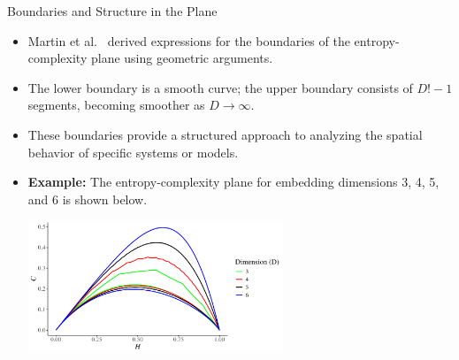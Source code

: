 \documentclass{beamer}
\begin{document}
	
	 


\begin{frame}{Boundaries and Structure in the Plane}
	\begin{itemize}
		\item Martin et al.~\cite{Martin2006} derived expressions for the boundaries of the entropy-complexity plane using geometric arguments.
		\item The \alert{lower boundary} is a smooth curve; the \alert{upper boundary} consists of $D!-1$ segments, becoming smoother as $D \to \infty$.
		\item These boundaries provide a structured approach to analyzing the spatial behavior of specific systems or models.
		\item \textbf{Example:} The entropy-complexity plane for embedding dimensions 3, 4, 5, and 6 is shown below.
		\begin{center}
			\includegraphics[width=0.6\textwidth]{complexity plane}
		\end{center}
	\end{itemize}
\end{frame}
\end{document}
